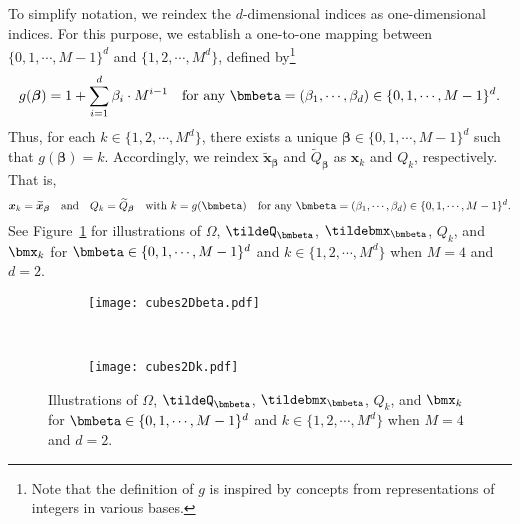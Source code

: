 \documentclass[11pt,a4paper]{article}
\begin{document}
To simplify notation, we reindex the \(d\)-dimensional indices as one-dimensional indices. For this purpose, we establish a one-to-one mapping between \(\{0, 1, \cdots, M-1\}^d\) and \(\{1, 2, \cdots, M^d\}\), defined by\footnote{Note that the definition of \(g\) is inspired by concepts from representations of integers in various bases.}
\[
g(\bm{\beta}) = 1 + \sum_{i=1}^{d} \beta_i \cdot M^{i-1}\quad \tn{for any $\bmbeta=(\beta_1,\cdots,\beta_d)\in \{0, 1, \cdots, M-1\}^d$}.
\]
Thus, for each \(k \in \{1, 2, \cdots, M^d\}\), there exists a unique \(\bm{\beta} \in \{0, 1, \cdots, M-1\}^d\) such that \(g(\bm{\beta}) = k\). Accordingly, we reindex \(\tilde{\bm{x}}_{\bm{\beta}}\) and \(\tilde{Q}_{\bm{\beta}}\) as \(\bm{x}_k\) and \(Q_k\), respectively. That is,
\begin{equation*}
    \bm{x}_{k}= \tilde{\bm{x}}_{\bm{\beta}}
 \quad \tn{and}\quad  Q_{k}=  \tilde{Q}_{\bm{\beta}}\quad \tn{with $k=g(\bmbeta)$}\quad \tn{for any $\bmbeta=(\beta_1,\cdots,\beta_d)\in \{0, 1, \cdots, M-1\}^d$}.
\end{equation*}
See Figure~\ref{fig:Omega:Q:x} for illustrations of  $\Omega$,  $\tildeQ_\bmbeta$,  $\tildebmx_\bmbeta$, $Q_k$, and $\bmx_k$ for $\bmbeta\in \{0,1,\cdots,M-1\}^d$ and $k\in \{1,2,\cdots,M^d\}$
 when $M=4$ and $d=2$.

 \begin{figure}[!htp]
	\centering
	\begin{minipage}{0.905\textwidth}
		\centering
		\begin{subfigure}[b]{0.4\textwidth}
			\centering
			\texttt{[image: cubes2Dbeta.pdf]}
		\end{subfigure}
			\begin{minipage}{0.1\textwidth}
				\
			\end{minipage}
		\begin{subfigure}[b]{0.4\textwidth}
			\centering
			\texttt{[image: cubes2Dk.pdf]}
		\end{subfigure}
	\end{minipage}
	\caption{Illustrations of  $\Omega$,  $\tildeQ_\bmbeta$,  $\tildebmx_\bmbeta$, $Q_k$, and $\bmx_k$ for $\bmbeta\in \{0,1,\cdots,M-1\}^d$ and $k\in \{1,2,\cdots,M^d\}$
 when $M=4$ and $d=2$. }
	\label{fig:Omega:Q:x}
\end{figure}
\end{document}
